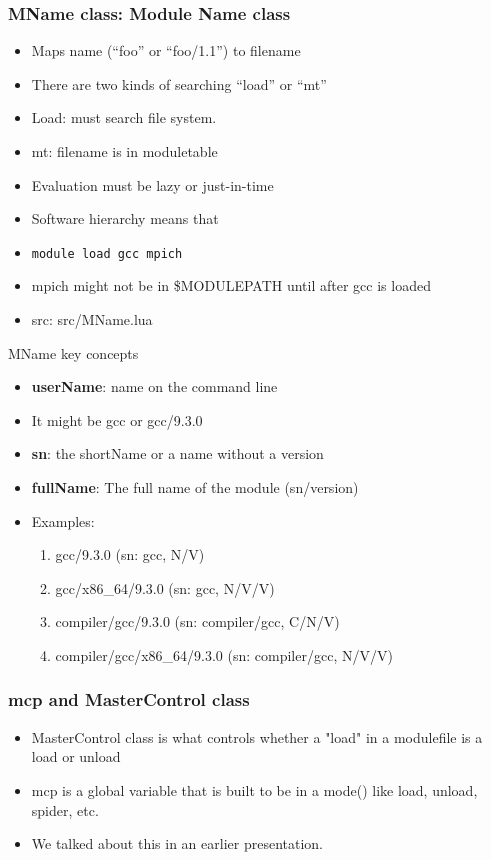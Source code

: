 \documentclass{beamer}
\begin{document}
\begin{frame}[fragile]
\begin{frame}[fragile]
    \frametitle{MName class: Module Name class}
 {\tiny
    \begin{semiverbatim}
    \end{semiverbatim}
}
  \begin{itemize}
    \item Maps name (``foo'' or ``foo/1.1'') to filename
    \item There are two kinds of searching ``load'' or ``mt''
    \item Load: must search file system. 
    \item mt: filename is in moduletable
    \item Evaluation must be lazy or just-in-time
    \item Software hierarchy means that 
    \item {\color{blue}\texttt{module load gcc mpich}}
    \item mpich might not be in \$MODULEPATH until after gcc is loaded
    \item src: src/MName.lua
  \end{itemize}

\end{frame}

\begin{frame}{MName key concepts}
  \begin{itemize}
    \item \textbf{userName}: name on the command line
    \item It might be gcc or gcc/9.3.0
    \item \textbf{sn}: the shortName or a name without a version
    \item \textbf{fullName}: The full name of the module (sn/version)
    \item Examples:
      \begin{enumerate}
        \item gcc/9.3.0 (sn: gcc, N/V)
        \item gcc/x86\_64/9.3.0 (sn: gcc, N/V/V)
        \item compiler/gcc/9.3.0 (sn: compiler/gcc, C/N/V)
        \item compiler/gcc/x86\_64/9.3.0 (sn: compiler/gcc, N/V/V)
      \end{enumerate}
  \end{itemize}
\end{frame}

\begin{frame}[fragile]
    \frametitle{mcp and MasterControl class}
  \begin{itemize}
    \item MasterControl class is what controls whether a "load" in a
      modulefile is a load or unload
    \item mcp is a global variable that is built to be in a mode()
      like load, unload, spider, etc.
    \item We talked about this in an earlier presentation.
  \end{itemize}
\end{frame}


\end{frame}
\end{document}
